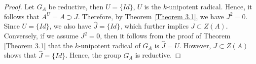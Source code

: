 \documentclass[10pt,a4paper]{amsart}
\begin{document}
\begin{proof}
    Let $G_A$ be reductive, then $U=\{Id\}$, $U$ is the $k$-unipotent radical. Hence, it follows that $A^U=A\supset J$. Therefore, by Theorem \ref{Theorem 3.1}, we have $J^2=0$. Since $U=\{Id\}$, we also have $\hat{J}=\{Id\}$, which further implies $J\subset Z(A)$. Conversely, if we assume $J^2=0$, then it follows from the proof of Theorem \ref{Theorem 3.1} that the $k$-unipotent radical of $G_A$ is $\hat{J}=U$. However, $J\subset Z(A)$ shows that $\hat{J}=\{Id\}$. Hence, the group $G_A$ is reductive.
\end{proof}
\end{document}
